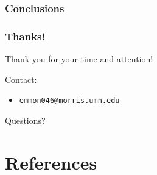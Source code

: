 \documentclass{beamer}
\newcommand{\linespace}{\vskip 0.25cm}
\begin{document}
\begin{frame}
\frametitle{Conclusions}

%
%  
%  
%
%  
%

\end{frame}

\begin{frame}
	\frametitle{Thanks!}
	
	Thank you for your time and attention!
		
	\linespace
	\linespace
	
	Contact:  
	\begin{itemize}
		\item \texttt{emmon046@morris.umn.edu}
	\end{itemize}
	
	\linespace
	\linespace
	
	\begin{center}
	{\huge Questions?}
	\end{center}
\end{frame}

\section*{References}
\end{document}
